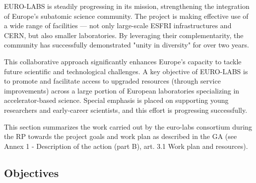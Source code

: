 EURO-LABS is steadily progressing in its mission, strengthening the integration of Europe’s subatomic science community. The project is making effective use of a wide range of facilities — not only large-scale ESFRI infrastructures and CERN, but also smaller laboratories. By leveraging their complementarity, the community has successfully demonstrated "unity in diversity" for over two years.

This collaborative approach significantly enhances Europe’s capacity to tackle future scientific and technological challenges. A key objective of EURO-LABS is to promote and facilitate access to upgraded resources (through service improvements) across a large portion of European laboratories specializing in accelerator-based science. Special emphasis is placed on supporting young researchers and early-career scientists, and this effort is progressing successfully.

This section summarizes the work carried out by the \acrshort{euro-labs} consortium during the  \acrshort{RP} towards the project goals and work plan as described in the \acrfull{GA} (see Annex 1 - Description of the action (part B), art. 3.1 Work plan and resources).

\subsection{Objectives}

